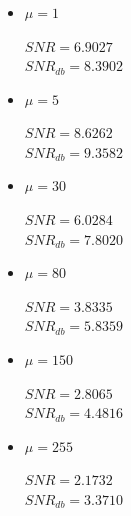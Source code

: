 \documentclass[a4paper]{article}
\begin{document}
\subsubsection{}
\begin{itemize}
	\item 
	$\mu = 1$
	\begin{flushleft}
		$SNR = 6.9027$\\
		$SNR_{db} = 8.3902$
	\end{flushleft}
	\item 
	$\mu = 5$
	\begin{flushleft}
		$SNR = 8.6262$\\
		$SNR_{db} = 9.3582$
	\end{flushleft}
	\item 
	$\mu = 30$
	\begin{flushleft}
		$SNR = 6.0284$\\
		$SNR_{db} = 7.8020$
	\end{flushleft}
	\item 
	$\mu = 80$
	\begin{flushleft}
		$SNR = 3.8335 $\\
		$SNR_{db} = 5.8359$
	\end{flushleft}
	\item 
	$\mu = 150$
	\begin{flushleft}
		$SNR = 2.8065$\\
		$SNR_{db} = 4.4816 $
	\end{flushleft}
	\item 
	$\mu = 255$
	\begin{flushleft}
		$SNR = 2.1732$\\
		$SNR_{db} = 3.3710$
	\end{flushleft}
\end{itemize}
\end{document}
